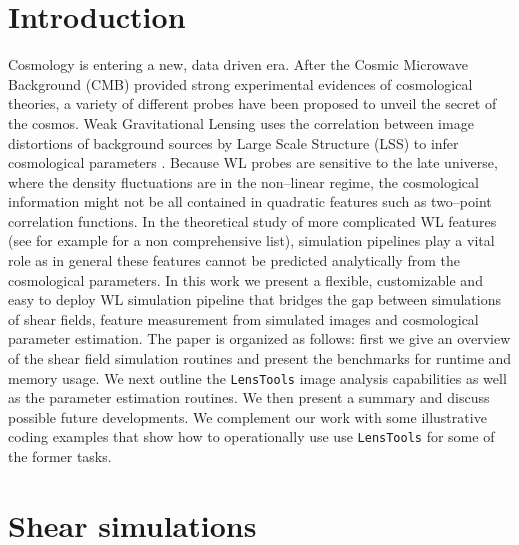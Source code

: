 \documentclass[reprint,aps,prd,superscriptaddress,showkeys,showpacs]{revtex4-1}
\newcommand{\LT}{\texttt{LensTools} }
\begin{document}
\section{Introduction}
%
Cosmology is entering a new, data driven era. After the Cosmic Microwave Background (CMB) \citep{WMAP,PlanckXVI2013} provided strong experimental evidences of cosmological theories, a variety of different probes have been proposed to unveil the secret of the cosmos. Weak Gravitational Lensing uses the correlation between image distortions of background sources by Large Scale Structure (LSS) to infer cosmological parameters \citep{WLprimer}. Because WL probes are sensitive to the late universe, where the density fluctuations are in the non--linear regime, the cosmological information might not be all contained in quadratic features such as two--point correlation functions. In the theoretical study of more complicated WL features (see for example \citep{3pcf1,bispectrum1,moments1,peaks1} for a non comprehensive list), simulation pipelines play a vital role as in general these features cannot be predicted analytically from the cosmological parameters. In this work we present a flexible, customizable and easy to deploy WL simulation pipeline that bridges the gap between simulations of shear fields, feature measurement from simulated images and cosmological parameter estimation. The paper is organized as follows: first we give an overview of the shear field simulation routines and present the benchmarks for runtime and memory usage. We next outline the \LT image analysis capabilities as well as the parameter estimation routines. We then present a summary and discuss possible future developments. We complement our work with some illustrative coding examples that show how to operationally use use \LT for some of the former tasks.


\section{Shear simulations} 
\end{document}

